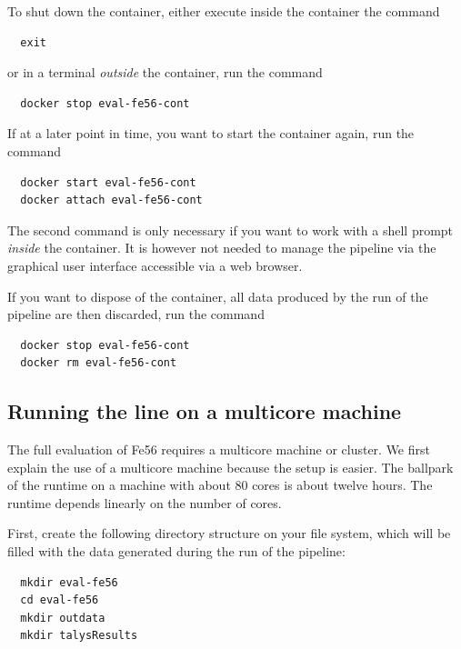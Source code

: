 \documentclass[12pt,a4paper]{scrartcl}
\begin{document}
To shut down the container, either execute inside the container the command
\begin{verbatim}
  exit
\end{verbatim}
or in a terminal \textit{outside} the container, run the command
\begin{verbatim}
  docker stop eval-fe56-cont
\end{verbatim}
If at a later point in time, you want to start the container again, run the command
\begin{verbatim}
  docker start eval-fe56-cont
  docker attach eval-fe56-cont
\end{verbatim}
The second command is only necessary if you want to work with a shell prompt \textit{inside} the container.
It is however not needed to manage the pipeline via the graphical user interface accessible via a web browser.

If you want to dispose of the container, all data produced by the run of the pipeline are then discarded,
run the command
\begin{verbatim}
  docker stop eval-fe56-cont
  docker rm eval-fe56-cont
\end{verbatim}

\subsection{Running the line on a multicore machine}

The full evaluation of Fe56 requires a multicore machine or cluster.
We first explain the use of a multicore machine because the setup is easier.
The ballpark of the runtime on a machine with about 80 cores is about twelve hours.
The runtime depends linearly on the number of cores.

First, create the following directory structure on your file system,
which will be filled with the data generated during the run of the pipeline:
\begin{verbatim}
  mkdir eval-fe56
  cd eval-fe56
  mkdir outdata
  mkdir talysResults
\end{verbatim}
\end{document}
